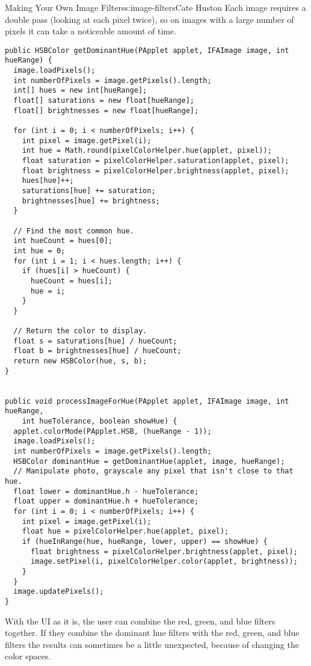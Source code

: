 \begin{aosachapter}{Making Your Own Image Filters}{s:image-filters}{Cate Huston}
Each image requires a double pass (looking at each pixel twice), so on
images with a large number of pixels it can take a noticeable amount of
time.

\begin{verbatim}
public HSBColor getDominantHue(PApplet applet, IFAImage image, int hueRange) {
  image.loadPixels();
  int numberOfPixels = image.getPixels().length;
  int[] hues = new int[hueRange];
  float[] saturations = new float[hueRange];
  float[] brightnesses = new float[hueRange];

  for (int i = 0; i < numberOfPixels; i++) {
    int pixel = image.getPixel(i);
    int hue = Math.round(pixelColorHelper.hue(applet, pixel));
    float saturation = pixelColorHelper.saturation(applet, pixel);
    float brightness = pixelColorHelper.brightness(applet, pixel);
    hues[hue]++;
    saturations[hue] += saturation;
    brightnesses[hue] += brightness;
  }

  // Find the most common hue.
  int hueCount = hues[0];
  int hue = 0;
  for (int i = 1; i < hues.length; i++) {
    if (hues[i] > hueCount) {
      hueCount = hues[i];
      hue = i;
    }
  }

  // Return the color to display.
  float s = saturations[hue] / hueCount;
  float b = brightnesses[hue] / hueCount;
  return new HSBColor(hue, s, b);
}


public void processImageForHue(PApplet applet, IFAImage image, int hueRange,
    int hueTolerance, boolean showHue) {
  applet.colorMode(PApplet.HSB, (hueRange - 1));
  image.loadPixels();
  int numberOfPixels = image.getPixels().length;
  HSBColor dominantHue = getDominantHue(applet, image, hueRange);
  // Manipulate photo, grayscale any pixel that isn't close to that hue.
  float lower = dominantHue.h - hueTolerance;
  float upper = dominantHue.h + hueTolerance;
  for (int i = 0; i < numberOfPixels; i++) {
    int pixel = image.getPixel(i);
    float hue = pixelColorHelper.hue(applet, pixel);
    if (hueInRange(hue, hueRange, lower, upper) == showHue) {
      float brightness = pixelColorHelper.brightness(applet, pixel);
      image.setPixel(i, pixelColorHelper.color(applet, brightness));
    }
  }
  image.updatePixels();
}
\end{verbatim}

\label{combining-filters}

With the UI as it is, the user can combine the red, green, and blue
filters together. If they combine the dominant hue filters with the red,
green, and blue filters the results can sometimes be a little
unexpected, because of changing the color spaces.


\end{aosachapter}
